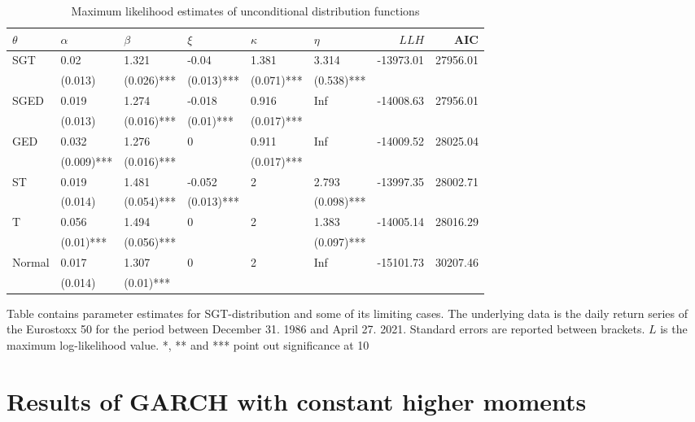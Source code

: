 \documentclass[a4paper, twoside]{templates/ociamthesis}
\begin{document}
\begin{table}[h!]

\caption{\label{tab:MLEtable}Maximum likelihood estimates of unconditional distribution functions}
\centering
\begin{threeparttable}
\begin{tabular}[t]{llllllrr}
\toprule
$\theta$ & $\alpha$ & $\beta$ & $\xi$ & $\kappa$ & $\eta$ & $LLH$ & AIC\\
\midrule
SGT & 0.02 & 1.321 & -0.04 & 1.381 & 3.314 & -13973.01 & 27956.01\\
 & (0.013) & (0.026)*** & (0.013)*** & (0.071)*** & (0.538)*** &  & \\
SGED & 0.019 & 1.274 & -0.018 & 0.916 & Inf & -14008.63 & 27956.01\\
 & (0.013) & (0.016)*** & (0.01)*** & (0.017)*** &  &  & \\
GED & 0.032 & 1.276 & 0 & 0.911 & Inf & -14009.52 & 28025.04\\
\addlinespace
 & (0.009)*** & (0.016)*** &  & (0.017)*** &  &  & \\
ST & 0.019 & 1.481 & -0.052 & 2 & 2.793 & -13997.35 & 28002.71\\
 & (0.014) & (0.054)*** & (0.013)*** &  & (0.098)*** &  & \\
T & 0.056 & 1.494 & 0 & 2 & 1.383 & -14005.14 & 28016.29\\
 & (0.01)*** & (0.056)*** &  &  & (0.097)*** &  & \\
\addlinespace
Normal & 0.017 & 1.307 & 0 & 2 & Inf & -15101.73 & 30207.46\\
 & (0.014) & (0.01)*** &  &  &  &  & \\
\bottomrule
\end{tabular}
\begin{tablenotes}
\item Table contains parameter estimates for SGT-distribution and some of its limiting cases. The underlying data is the daily return series of the Eurostoxx 50 for the period between December 31. 1986 and April 27. 2021. Standard errors are reported between brackets. $L$ is the maximum log-likelihood value. *, ** and *** point out significance at 10%
\end{tablenotes}
\end{threeparttable}
\end{table}

\hypertarget{results-of-garch-with-constant-higher-moments}{%
\section{Results of GARCH with constant higher moments}\label{results-of-garch-with-constant-higher-moments}}
\end{document}

